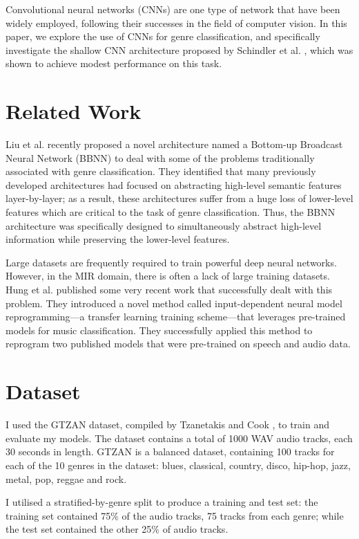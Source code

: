 \documentclass[conference]{IEEEtran}
\begin{document}
Convolutional neural networks (CNNs) are one type of network that have been widely employed, following their successes in the field of computer vision.
In this paper, we explore the use of CNNs for genre classification, and specifically investigate the shallow CNN architecture proposed by Schindler et al. \cite{SchindlerLidyRauber}, which was shown to achieve modest performance on this task.

\section{Related Work}

Liu et al. \cite{LiuFengLiuWangLiu} recently proposed a novel architecture named a Bottom-up Broadcast Neural Network (BBNN) to deal with some of the problems traditionally associated with genre classification.
They identified that many previously developed architectures had focused on abstracting high-level semantic features layer-by-layer; as a result, these architectures suffer from a huge loss of lower-level features which are critical to the task of genre classification.
Thus, the BBNN architecture was specifically designed to simultaneously abstract high-level information while preserving the lower-level features.

Large datasets are frequently required to train powerful deep neural networks.
However, in the MIR domain, there is often  a lack of large training datasets.
Hung et al. \cite{HungYangChenLerch} published some very recent work that successfully dealt with this problem.
They introduced a novel method called input-dependent neural model reprogramming---a transfer learning training scheme---that leverages pre-trained models for music classification.
They successfully applied this method to reprogram two published models that were pre-trained on speech and audio data.

\section{Dataset}

I used the GTZAN dataset, compiled by Tzanetakis and Cook \cite{TzanetakisCook}, to train and evaluate my models.
The dataset contains a total of 1000 WAV audio tracks, each 30 seconds in length.
GTZAN is a balanced dataset, containing 100 tracks for each of the 10 genres in the dataset: blues, classical, country, disco, hip-hop, jazz, metal, pop, reggae and rock.

I utilised a stratified-by-genre split to produce a training and test set: the training set contained 75\% of the audio tracks, 75 tracks from each genre; while the test set contained the other 25\% of audio tracks.
\end{document}
